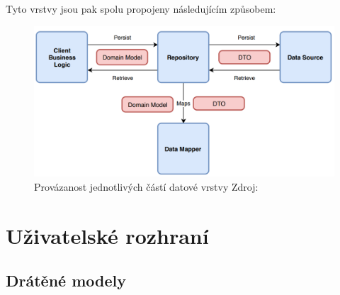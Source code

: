 \bigskip

Tyto vrstvy jsou pak spolu propojeny následujícím způsobem:

\begin{figure}[H]
  \centering
  \includegraphics[width=.8\textwidth]{arch_diagram.png}
  \caption{Provázanost jednotlivých částí datové vrstvy Zdroj: \cite{imgDataDiagram}}
  \label{fig:arch_diagram}
\end{figure}

\bigskip







\section{Uživatelské rozhraní}





\subsection{Drátěné modely} \label{navrhWireframes}

